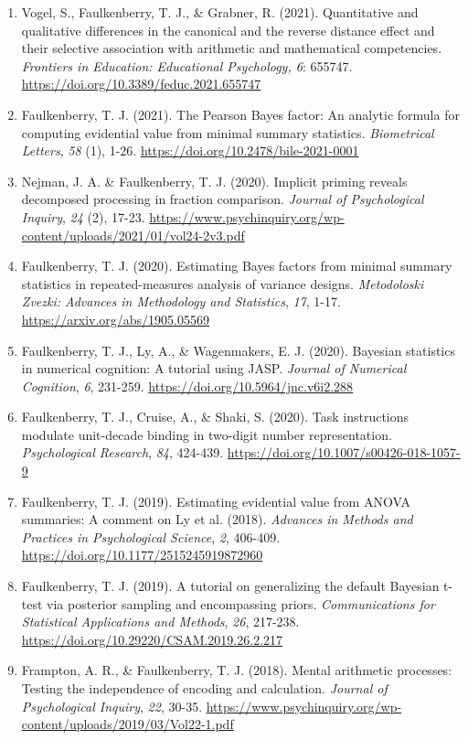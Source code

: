 \documentclass[article,10pt]{article}
\begin{document}
\begin{enumerate}
\item Vogel, S., Faulkenberry, T. J., \& Grabner, R. (2021). Quantitative and qualitative differences in the canonical and the reverse distance effect and their selective association with arithmetic and mathematical competencies. \emph{Frontiers in Education: Educational Psychology, 6}: 655747. \url{https://doi.org/10.3389/feduc.2021.655747}
\item Faulkenberry, T. J. (2021). The Pearson Bayes factor: An analytic formula for computing evidential value from minimal summary statistics. \emph{Biometrical Letters}, \emph{58} (1), 1-26. \url{https://doi.org/10.2478/bile-2021-0001}
\item Nejman, J. A. \& Faulkenberry, T. J. (2020). Implicit priming reveals decomposed processing in fraction comparison. \emph{Journal of Psychological Inquiry}, \emph{24} (2), 17-23. \url{https://www.psychinquiry.org/wp-content/uploads/2021/01/vol24-2v3.pdf}
\item Faulkenberry, T. J. (2020). Estimating Bayes factors from minimal summary statistics in repeated-measures analysis of variance designs. \emph{Metodoloski Zvezki: Advances in Methodology and Statistics}, \emph{17}, 1-17.  \url{https://arxiv.org/abs/1905.05569}
\item Faulkenberry, T. J., Ly, A., \& Wagenmakers, E. J. (2020). Bayesian statistics in numerical cognition: A tutorial using JASP. \emph{Journal of Numerical Cognition}, \emph{6}, 231-259. \url{https://doi.org/10.5964/jnc.v6i2.288}
\item Faulkenberry, T. J., Cruise, A., \& Shaki, S. (2020). Task instructions modulate unit-decade binding in two-digit number representation. \emph{Psychological Research}, \emph{84}, 424-439. \url{https://doi.org/}\href{https://dx.doi.org/10.1007/s00426-018-1057-9}{10.1007/s00426-018-1057-9}
\item Faulkenberry, T. J. (2019). Estimating evidential value from ANOVA summaries: A comment on Ly et al. (2018). \emph{Advances in Methods and Practices in Psychological Science}, \emph{2}, 406-409. \url{https://doi.org/}\href{https://doi.org/10.1177/2515245919872960}{10.1177/2515245919872960}
\item Faulkenberry, T. J. (2019). A tutorial on generalizing the default Bayesian t-test via posterior sampling and encompassing priors. \emph{Communications for Statistical Applications and Methods}, \emph{26}, 217-238. \url{https://doi.org/}\href{https://doi.org/10.29220/CSAM.2019.26.2.217}{10.29220/CSAM.2019.26.2.217}
\item Frampton, A. R., \& Faulkenberry, T. J. (2018). Mental arithmetic processes: Testing the independence of encoding and calculation. \emph{Journal of Psychological Inquiry}, \emph{22}, 30-35. \url{https://www.psychinquiry.org/wp-content/uploads/2019/03/Vol22-1.pdf}

\end{enumerate}
\end{document}
